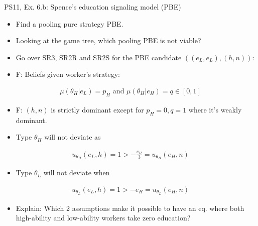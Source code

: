 \begin{frame}{PS11, Ex. 6.b: Spence’s education signaling model (PBE)}
    \begin{multicols}{2}
      \begin{itemize}
        \item[(b)] Find a pooling pure strategy PBE.
        \item[Step 1:] Looking at the game tree, which pooling PBE is not viable?
        \item[Step 2:] Go over SR3, SR2R and SR2S for the PBE candidate $((e_L,e_L),(h,n))$:
        \item[SR3:] F: Beliefs given worker's strategy:
      \end{itemize}\vspace{-10pt}
      \begin{align*}
        \mu(\theta_H|e_L)=p_H\text{ and }\mu(\theta_H|e_H)=q\in[0,1]
      \end{align*}\vspace{-20pt}
      \begin{itemize}
        \item[SR2R:] F: $(h,n)$ is strictly dominant except for $p_H=0,q=1$ where it's weakly dominant.
        \item[SR2S:] Type $\theta_H$ will not deviate as
      \end{itemize}\vspace{-12pt}
      \begin{align*}
        u_{\theta_H}(e_L,h)=1>-\frac{e_H}{3}=u_{\theta_H}(e_H,n)
      \end{align*}\vspace{-20pt}
      \begin{itemize}
        \item[] Type $\theta_L$ will not deviate when
      \end{itemize}\vspace{-12pt}
      \begin{align*}
        u_{\theta_L}(e_L,h)=1>-e_H=u_{\theta_L}(e_H,n)
      \end{align*}\vspace{-20pt}
      \begin{itemize}
        \item[Step 3:] Explain: Which 2 assumptions make it possible to have an eq. where both high-ability and low-ability workers take zero education?
      \end{itemize}
      \vfill\null\columnbreak
      \begin{figure}[!h]

\end{figure}
\end{multicols}
\end{frame}
